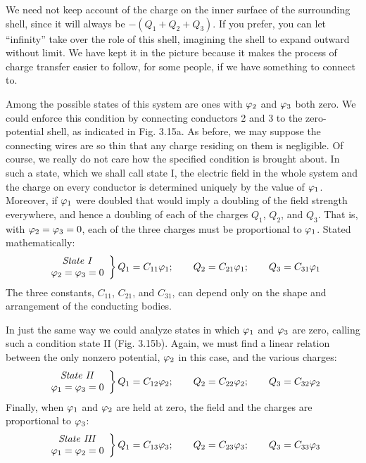 We need not keep account of the charge on the inner surface of
the surrounding shell, since it will always be $-(Q_1 + Q_2 + Q_3)$.
If you prefer, you can let ``infinity'' take over the role of this shell,
imagining the shell to expand outward without limit. We have kept
it in the picture because it makes the process of charge transfer easier
to follow, for some people, if we have something to connect to.

Among the possible states of this system are ones with $\varphi_2$ and $\varphi_3$
both zero. We could enforce this condition by connecting conductors
2 and 3 to the zero-potential shell, as indicated in Fig. 3.15a.
As before, we may suppose the connecting wires are so thin that any
charge residing on them is negligible. Of course, we really do not
care how the specified condition is brought about. In such a state,
which we shall call state I, the electric field in the whole system and
the charge on every conductor is determined uniquely by the value
of $\varphi_1$. Moreover, if $\varphi_1$ were doubled that would imply a doubling
of the field strength everywhere, and hence a doubling of each of
the charges $Q_1$, $Q_2$, and $Q_3$. That is, with $\varphi_2 = \varphi_3 = 0$, each of the
three charges must be proportional to $\varphi_1$. Stated mathematically:
\begin{equation}
  \left.
  \begin{array}{cc}
    \text{\emph{State I}} \\
    \varphi_2 = \varphi_3 = 0
  \end{array}
  \right\}
  Q_1=C_{11}\varphi_1; \qquad Q_2=C_{21}\varphi_1; \qquad Q_3=C_{31}\varphi_1
\end{equation}
The three constants, $C_{11}$, $C_{21}$, and $C_31$, can depend only on the shape
and arrangement of the conducting bodies.

In just the same way we could analyze states in which $\varphi_1$ and $\varphi_3$
are zero, calling such a condition state II (Fig. 3.15b). Again, we
must find a linear relation between the only nonzero potential, $\varphi_2$ in
this case, and the various charges:
\begin{equation}
  \left.
  \begin{array}{cc}
    \text{\emph{State II}} \\
    \varphi_1 = \varphi_3 = 0
  \end{array}
  \right\}
  Q_1=C_{12}\varphi_2; \qquad Q_2=C_{22}\varphi_2; \qquad Q_3=C_{32}\varphi_2
\end{equation}
Finally, when $\varphi_1$ and $\varphi_2$ are held at zero, the field and the charges
are proportional to $\varphi_3$:
\begin{equation}
  \left.
  \begin{array}{cc}
    \text{\emph{State III}} \\
    \varphi_1 = \varphi_2 = 0
  \end{array}
  \right\}
  Q_1=C_{13}\varphi_3; \qquad Q_2=C_{23}\varphi_3; \qquad Q_3=C_{33}\varphi_3
\end{equation}

